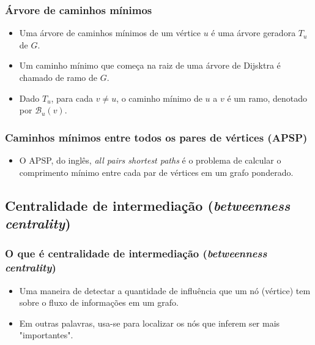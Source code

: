 \documentclass{beamer}
\begin{document}
        \begin{frame}
            \frametitle{Árvore de caminhos mínimos}
            \begin{itemize}
                \item Uma árvore de caminhos mínimos de um vértice $u$ é uma árvore geradora $T_u$ de $G$.
                \item Um caminho mínimo que começa na raiz de uma árvore de Dijsktra é chamado de ramo de $G$.
                \item Dado $T_u$, para cada $v \neq u$, o caminho mínimo de $u$ a $v$ é um ramo, denotado por $\mathcal{B}_u(v)$.
            \end{itemize}
        \end{frame}

        \begin{frame}
            \frametitle{Caminhos mínimos entre todos os pares de vértices (APSP)}
            \begin{itemize}
                \item O APSP, do inglês, {\it all pairs shortest paths} é o problema de calcular o comprimento mínimo entre cada par de vértices em um grafo ponderado.
            \end{itemize}
        \end{frame}

    \subsection{Centralidade de intermediação (\emph{betweenness centrality})}
        \begin{frame}
            \frametitle{O que é centralidade de intermediação (\emph{betweenness centrality})}
            \begin{itemize}
                \item Uma maneira de detectar a quantidade de influência que um nó (vértice) tem sobre o fluxo de informações em um grafo.
                \item Em outras palavras, usa-se para localizar os nós que inferem ser mais "importantes".
            \end{itemize}
        \end{frame}
\end{document}
